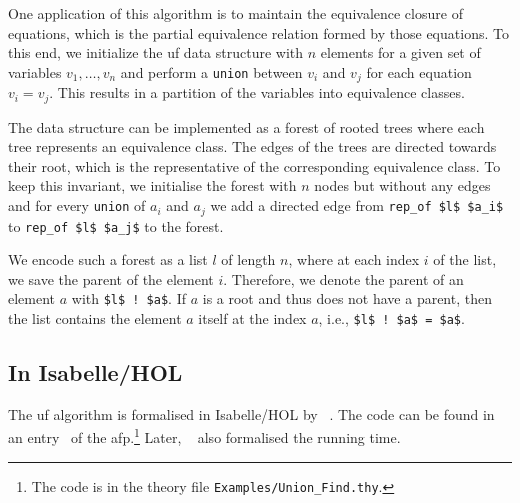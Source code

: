 \documentclass[
  sigplan,
  10pt,
  anonymous,
  review,
  ]{acmart}
\begin{document}
One application of this algorithm is to maintain the equivalence closure of equations, which is the partial equivalence relation formed by those equations.
To this end, we initialize the \acrshort{uf} data structure with $n$ elements for a given set of variables $v_1, \ldots, v_n$ and perform a \lstinline!union! between $v_i$ and $v_j$ for each equation $v_i = v_j$.
This results in a partition of the variables into equivalence classes.

The data structure can be implemented as a forest of rooted trees where each tree represents an equivalence class.
The edges of the trees are directed towards their root, which is the representative of the corresponding equivalence class.
To keep this invariant, we initialise the forest with $n$ nodes but without any edges and for every \lstinline!union! of $a_i$ and $a_j$ we add a directed edge from \lstinline!rep_of $l$ $a_i$! to \lstinline!rep_of $l$ $a_j$! to the forest.

We encode such a forest as a list $l$ of length $n$, where at each index $i$ of the list, we save the parent of the element $i$.
Therefore, we denote the parent of an element $a$ with \lstinline|$l$ ! $a$|.
If $a$ is a root and thus does not have a parent, then the list contains the element $a$ itself at the index $a$, i.e., \lstinline|$l$ ! $a$ = $a$|.

\subsection{In Isabelle/HOL\label{sec:uf_hol}}
The \acrshort{uf} algorithm is formalised in Isabelle/HOL by \citeauthor{uf_isabelle}~\cite{uf_isabelle}.
The code can be found in an entry~\cite{uf_isabelle_afp} of the \acrfull{afp}.\footnote{The code is in the theory file \texttt{Examples/Union\_Find.thy}.}
Later, \citeauthor{uf_isabelle}~\cite{uf_isabelle} also formalised the running time.
\end{document}
